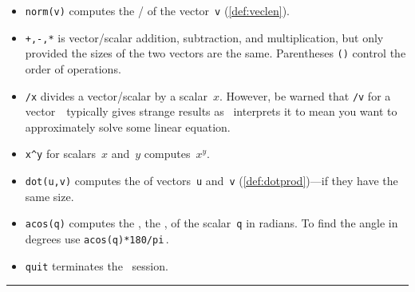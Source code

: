 \begin{table}
\begin{minipage}{\linewidth}
\begin{itemize}
\item {}\verb|norm(v)| computes the \slash {} of the vector~\verb|v| (\autoref{def:veclen}).

\item {}\verb|+,-,*| is vector\slash scalar addition, subtraction, and multiplication, but only provided the sizes of the two vectors are the same.
Parentheses \verb|()| control the order of operations.

\item {}\verb|/x| divides a vector\slash scalar by a scalar~\(x\).
However, be warned that \verb|/v| for a vector~\vv\ typically gives strange results as \script\ interprets it to mean you want to approximately solve some linear equation.

\item {}\verb|x^y| for scalars~\(x\) and~\(y\) computes~\(x^y\).

\item {}\verb|dot(u,v)| computes the  of vectors~\verb|u| and~\verb|v| (\autoref{def:dotprod})---if they have the same size.

\item {}\verb|acos(q)| computes the , the , of the scalar~\verb|q| in radians.  
To find the angle in degrees use \verb|acos(q)*180/pi|\,.

\item {}\verb|quit| terminates the \script\ session.
\end{itemize}
\end{minipage}
\hrule
\end{table}




